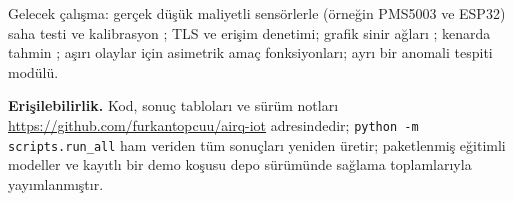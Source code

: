 \documentclass[conference]{IEEEtran}
\begin{document}
Gelecek çalışma: gerçek düşük maliyetli sensörlerle (örneğin PMS5003 ve ESP32) saha testi ve kalibrasyon \cite{R20,R1}; TLS ve erişim denetimi; grafik sinir ağları \cite{R12}; kenarda tahmin \cite{R6}; aşırı olaylar için asimetrik amaç fonksiyonları; ayrı bir anomali tespiti modülü.

\textbf{Erişilebilirlik.} Kod, sonuç tabloları ve sürüm notları \url{https://github.com/furkantopcuu/airq-iot} adresindedir; \texttt{python -m scripts.run\_all} ham veriden tüm sonuçları yeniden üretir; paketlenmiş eğitimli modeller ve kayıtlı bir demo koşusu depo sürümünde sağlama toplamlarıyla yayımlanmıştır.



\end{document}
